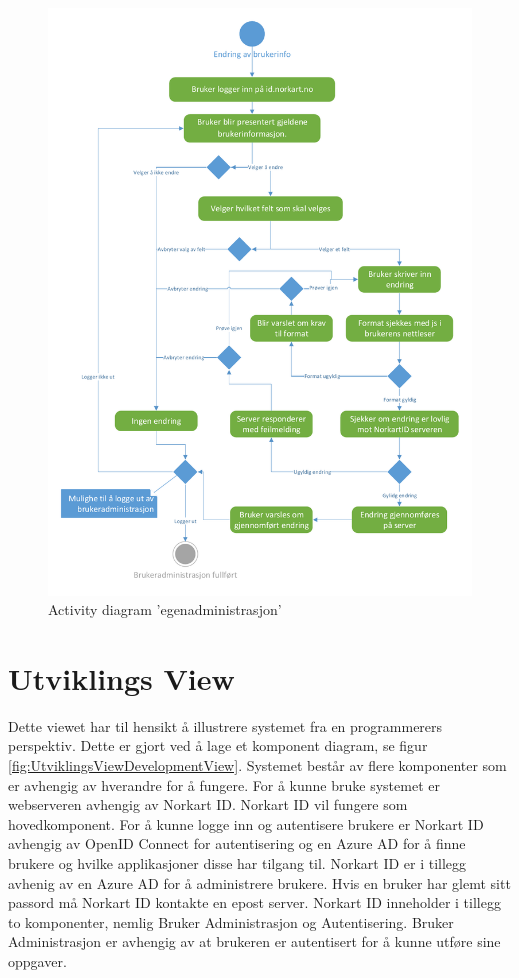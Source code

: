 \begin{figure}[H]
\centering
    \includegraphics[scale=0.65]{graphics/04-arkitektur/ProsessViewEgenadministrasjon}
    \caption{Activity diagram 'egenadministrasjon' }
    \label{fig:ProsessViewEgenadministrasjon}
\end{figure}

\section{Utviklings View}
\label{sec:utviklings_view}
Dette viewet har til hensikt å illustrere systemet fra en programmerers perspektiv. Dette er gjort ved å lage et komponent diagram, se figur \ref{fig:UtviklingsViewDevelopmentView}. Systemet består av flere komponenter som er avhengig av hverandre for å fungere. For å kunne bruke systemet er webserveren avhengig av Norkart ID. Norkart ID vil fungere som hovedkomponent. For å kunne logge inn og autentisere brukere er Norkart ID avhengig av OpenID Connect for autentisering og en Azure AD for å finne brukere og hvilke applikasjoner disse har tilgang til. Norkart ID er i tillegg avhenig av en Azure AD for å administrere brukere. Hvis en bruker har glemt sitt passord må Norkart ID kontakte en epost server.  Norkart ID inneholder i tillegg to komponenter, nemlig Bruker Administrasjon og Autentisering. Bruker Administrasjon er avhengig av at brukeren er autentisert for å kunne utføre sine oppgaver.

